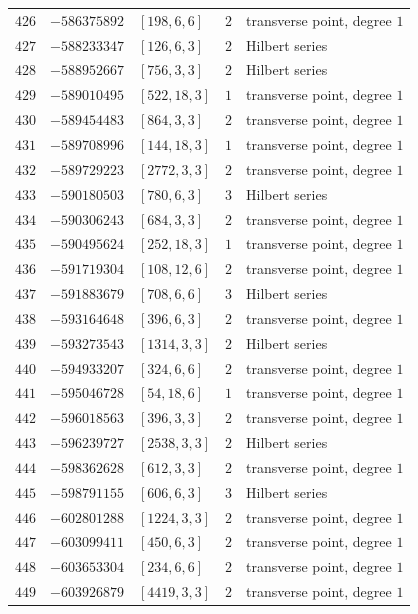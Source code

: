\documentclass[11pt]{article}
\begin{document}
\begin{center}
\begin{longtable}{r r l c l}
$426$ & $-586375892$ & $[198,6,6]$ & $2$ & transverse point, degree $1$\\
$427$ & $-588233347$ & $[126,6,3]$ & $2$ & Hilbert series\\
$428$ & $-588952667$ & $[756,3,3]$ & $2$ & Hilbert series\\
$429$ & $-589010495$ & $[522,18,3]$ & $1$ & transverse point, degree $1$\\
$430$ & $-589454483$ & $[864,3,3]$ & $2$ & transverse point, degree $1$\\
$431$ & $-589708996$ & $[144,18,3]$ & $1$ & transverse point, degree $1$\\
$432$ & $-589729223$ & $[2772,3,3]$ & $2$ & transverse point, degree $1$\\
$433$ & $-590180503$ & $[780,6,3]$ & $3$ & Hilbert series\\
$434$ & $-590306243$ & $[684,3,3]$ & $2$ & transverse point, degree $1$\\
$435$ & $-590495624$ & $[252,18,3]$ & $1$ & transverse point, degree $1$\\
$436$ & $-591719304$ & $[108,12,6]$ & $2$ & transverse point, degree $1$\\
$437$ & $-591883679$ & $[708,6,6]$ & $3$ & Hilbert series\\
$438$ & $-593164648$ & $[396,6,3]$ & $2$ & transverse point, degree $1$\\
$439$ & $-593273543$ & $[1314,3,3]$ & $2$ & Hilbert series\\
$440$ & $-594933207$ & $[324,6,6]$ & $2$ & transverse point, degree $1$\\
$441$ & $-595046728$ & $[54,18,6]$ & $1$ & transverse point, degree $1$\\
$442$ & $-596018563$ & $[396,3,3]$ & $2$ & transverse point, degree $1$\\
$443$ & $-596239727$ & $[2538,3,3]$ & $2$ & Hilbert series\\
$444$ & $-598362628$ & $[612,3,3]$ & $2$ & transverse point, degree $1$\\
$445$ & $-598791155$ & $[606,6,3]$ & $3$ & Hilbert series\\
$446$ & $-602801288$ & $[1224,3,3]$ & $2$ & transverse point, degree $1$\\
$447$ & $-603099411$ & $[450,6,3]$ & $2$ & transverse point, degree $1$\\
$448$ & $-603653304$ & $[234,6,6]$ & $2$ & transverse point, degree $1$\\
$449$ & $-603926879$ & $[4419,3,3]$ & $2$ & transverse point, degree $1$\\

\end{longtable}
\end{center}
\end{document}
